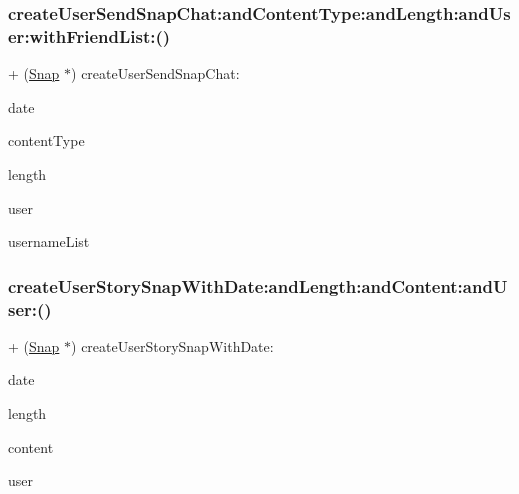 \subsubsection{\texorpdfstring{create\+User\+Send\+Snap\+Chat\+:and\+Content\+Type\+:and\+Length\+:and\+User\+:with\+Friend\+List\+:()}{createUserSendSnapChat:andContentType:andLength:andUser:withFriendList:()}}
{\footnotesize\ttfamily + (\hyperlink{interface_snap}{Snap} $\ast$) create\+User\+Send\+Snap\+Chat\+: \begin{DoxyParamCaption}\item[{(N\+S\+Date $\ast$)}]{date }\item[{andContentType:(int)}]{content\+Type }\item[{andLength:(float)}]{length }\item[{andUser:(\hyperlink{interface_user_info}{User\+Info} $\ast$)}]{user }\item[{withFriendList:(nonnull N\+S\+Mutable\+Array$<$ N\+S\+String $\ast$ $>$ $\ast$)}]{username\+List }\end{DoxyParamCaption}}

\hypertarget{interface_snap_create_a4091b6c8ec21168582dff07bd4345541}{}\label{interface_snap_create_a4091b6c8ec21168582dff07bd4345541} 
\subsubsection{\texorpdfstring{create\+User\+Story\+Snap\+With\+Date\+:and\+Length\+:and\+Content\+:and\+User\+:()}{createUserStorySnapWithDate:andLength:andContent:andUser:()}}
{\footnotesize\ttfamily + (\hyperlink{interface_snap}{Snap} $\ast$) create\+User\+Story\+Snap\+With\+Date\+: \begin{DoxyParamCaption}\item[{(N\+S\+Date $\ast$)}]{date }\item[{andLength:(float)}]{length }\item[{andContent:(nonnull \hyperlink{interface_content}{Content} $\ast$)}]{content }\item[{andUser:(nonnull \hyperlink{interface_user_info}{User\+Info} $\ast$)}]{user }\end{DoxyParamCaption}}

